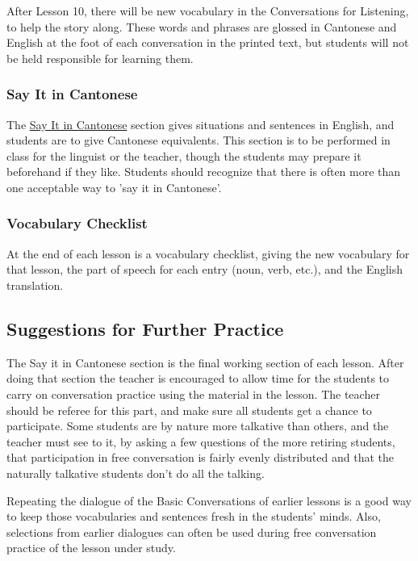 After Lesson 10, there will be new vocabulary in the Conversations for Listening, to help the story along. These words and phrases are glossed in Cantonese and English at the foot of each conversation in the printed text, but students will not be held responsible for learning them.


\subsubsection{Say It in Cantonese}

The \underline{Say It in Cantonese} section gives situations and sentences in English, and students are to give Cantonese equivalents. This section is to be performed in class for the linguist or the teacher, though the students may prepare it beforehand if they like. Students should recognize that there is often more than one acceptable way to 'say it in Cantonese'.


\subsubsection{Vocabulary Checklist}

At the end of each lesson is a vocabulary checklist, giving the new vocabulary for that lesson, the part of speech for each entry (noun, verb, etc.), and the English translation.

\subsection{Suggestions for Further Practice}

The Say it in Cantonese section is the final working section of each lesson. After doing that section the teacher is encouraged to allow time for the students to carry on conversation practice using the material in the lesson. The teacher should be referee for this part, and make sure all students get a chance to participate. Some students are by nature more talkative than others, and the teacher must see to it, by asking a few questions of the more retiring students, that participation in free conversation is fairly evenly distributed and that the naturally talkative students don't do all the talking.

Repeating the dialogue of the Basic Conversations of earlier lessons is a good way to keep those vocabularies and sentences fresh in the students' minds. Also, selections from earlier dialogues can often be used during free conversation practice of the lesson under study.

